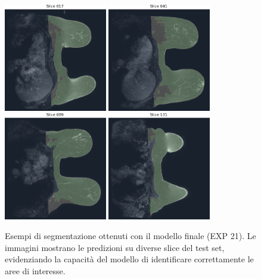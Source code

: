 \begin{figure}[H]
    \centering
    \includegraphics[width=0.40\textwidth]{figures/slice_017.png} 
    \includegraphics[width=0.40\textwidth]{figures/slice_041.png} 
    \includegraphics[width=0.40\textwidth]{figures/slice_089.png} 
    \includegraphics[width=0.40\textwidth]{figures/slice_131.png} 
    \caption{Esempi di segmentazione ottenuti con il modello finale (EXP 21). Le immagini mostrano le predizioni su diverse slice del test set, evidenziando la capacità del modello di identificare correttamente le aree di interesse.}
    \label{fig:final_segmentation_examples}
\end{figure}

